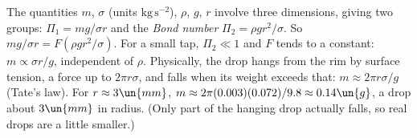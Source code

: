  The quantities $m$, $\sigma$ (units $\mathrm{kg\,s^{-2}}$), $\rho$, $g$, $r$ involve three dimensions, giving two groups: $\Pi_1 = mg/\sigma r$ and the \emph{Bond number} $\Pi_2 = \rho gr^2/\sigma$. So $mg/\sigma r = F(\rho gr^2/\sigma)$. For a small tap, $\Pi_2\ll1$ and $F$ tends to a constant: $m\propto\sigma r/g$, independent of $\rho$. Physically, the drop hangs from the rim by surface tension, a force up to $2\pi r\sigma$, and falls when its weight exceeds that: $m\approx2\pi r\sigma/g$ (Tate's law). For $r\approx3\un{mm}$, $m\approx2\pi(0.003)(0.072)/9.8\approx0.14\un{g}$, a drop about $3\un{mm}$ in radius. (Only part of the hanging drop actually falls, so real drops are a little smaller.)
